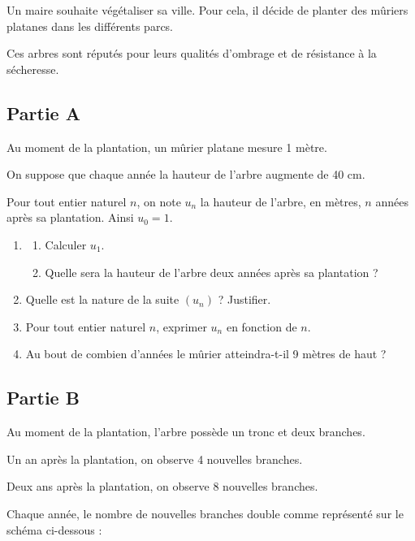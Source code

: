 Un maire souhaite végétaliser sa ville. Pour cela, il décide de planter des mûriers platanes dans les différents parcs.

Ces arbres sont réputés pour leurs qualités d'ombrage et de résistance à la sécheresse.

\subsection*{Partie A}

Au moment de la plantation, un mûrier platane mesure 1 mètre.

On suppose que chaque année la hauteur de l'arbre augmente de 40 cm.

Pour tout entier naturel $n$, on note $u_n$ la hauteur de l'arbre, en mètres, $n$ années après sa plantation. Ainsi $u_0=1$.

\begin{enumerate}
\item \begin{enumerate}
\item Calculer $u_1$.
\item Quelle sera la hauteur de l'arbre deux années après sa plantation ?
\end{enumerate}
\item Quelle est la nature de la suite $(u_n)$ ? Justifier.
\item Pour tout entier naturel $n$, exprimer $u_n$ en fonction de $n$.
\item Au bout de combien d'années le mûrier atteindra-t-il 9 mètres de haut ?
\end{enumerate}


\subsection*{Partie B}

Au moment de la plantation, l'arbre possède un tronc et deux branches.

Un an après la plantation, on observe 4 nouvelles branches.

Deux ans après la plantation, on observe 8 nouvelles branches.

Chaque année, le nombre de nouvelles branches double comme représenté sur le schéma ci-dessous :

